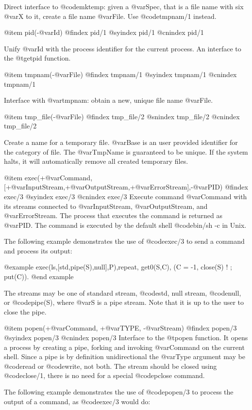 {{{{{{{{{Direct interface to @code{mktemp}: given a @var{Spec}, that is a file
name with six @var{X} to it, create a file name @var{File}. Use
@code{tmpnam/1} instead.

@item pid(-@var{Id})
@findex  pid/1
@syindex pid/1
@cnindex pid/1

Unify @var{Id} with the process identifier for the current
process. An interface to the @t{getpid} function.

@item tmpnam(-@var{File})
@findex  tmpnam/1
@syindex tmpnam/1
@cnindex tmpnam/1

Interface with @var{tmpnam}: obtain a new, unique file name @var{File}.

@item tmp_file(-@var{File})
@findex  tmp_file/2
@snindex tmp_file/2
@cnindex tmp_file/2

Create a name for a temporary file. @var{Base} is an user provided
identifier for the category of file. The @var{TmpName} is guaranteed to
be unique. If the system halts, it will automatically remove all created
temporary files.


@item exec(+@var{Command},[+@var{InputStream},+@var{OutputStream},+@var{ErrorStream}],-@var{PID})
@findex  exec/3
@syindex exec/3
@cnindex exec/3
Execute command @var{Command} with its streams connected to
@var{InputStream}, @var{OutputStream}, and @var{ErrorStream}. The
process that executes the command is returned as @var{PID}. The
command is executed by the default shell @code{bin/sh -c} in Unix.

The following example demonstrates the use of @code{exec/3} to send a
command and process its output:

@example
exec(ls,[std,pipe(S),null],P),repeat, get0(S,C), (C = -1, close(S) ! ; put(C)).
@end example

The streams may be one of standard stream, @code{std}, null stream,
@code{null}, or @code{pipe(S)}, where @var{S} is a pipe stream. Note
that it is up to the user to close the pipe.

@item popen(+@var{Command}, +@var{TYPE}, -@var{Stream})
@findex  popen/3
@syindex popen/3
@cnindex popen/3
Interface to the @t{popen} function. It opens a process by creating a
pipe, forking and invoking @var{Command} on the current shell. Since a
pipe is by definition unidirectional the @var{Type} argument may be
@code{read} or @code{write}, not both. The stream should be closed
using @code{close/1}, there is no need for a special @code{pclose}
command.

The following example demonstrates the use of @code{popen/3} to process
the output of a command, as @code{exec/3} would do:

}}}}}}}}}
